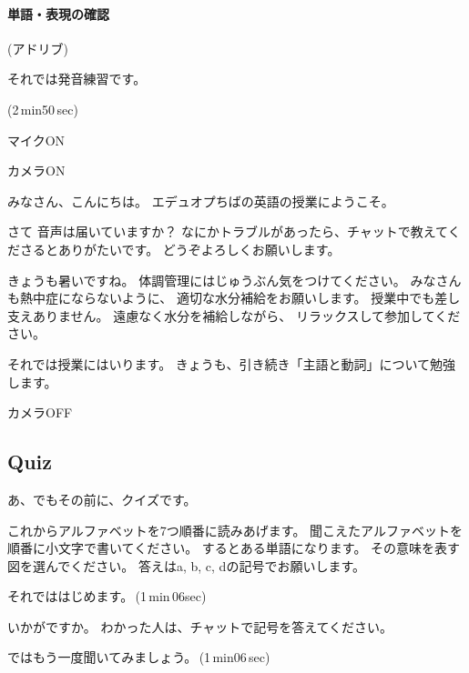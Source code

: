 \documentclass[12pt]{jlreq}
\newenvironment{my_check}
  {\begin{itemize}
    \renewcommand\labelitemi{$\square\hspace{0.5em}$}} %
  {\end{itemize}}
\begin{document}
\paragraph{単語・表現の確認}
(アドリブ)

それでは発音練習です。

\faVolumeUp{}(2\,min50\,sec)
\newpage

\begin{my_check}
\item マイクON
\item カメラON
\end{my_check}

{\LARGE \ComputerMouse}

みなさん、こんにちは。
エデュオプちばの英語の授業にようこそ。

さて
音声は届いていますか？
なにかトラブルがあったら、チャットで教えてくださるとありがたいです。
どうぞよろしくお願いします。



きょうも暑いですね。
体調管理にはじゅうぶん気をつけてください。
みなさんも熱中症にならないように、
適切な水分補給をお願いします。
授業中でも差し支えありません。
遠慮なく水分を補給しながら、
リラックスして参加してください。

それでは授業にはいります。
きょうも、引き続き「主語と動詞」について勉強します。

{\large \ComputerMouse}


\begin{my_check}
\item カメラOFF
\end{my_check}

{\LARGE \ComputerMouse}
\subsection{Quiz}

あ、でもその前に、クイズです。

これからアルファベットを7つ順番に読みあげます。
聞こえたアルファベットを順番に小文字で書いてください。
するとある単語になります。
その意味を表す図を選んでください。
答えはa, b, c, dの記号でお願いします。


それでははじめます。\faVolumeUp\,(1\,min\,06sec)

いかがですか。
わかった人は、チャットで記号を答えてください。


ではもう一度聞いてみましょう。\faVolumeUp\,(1\,min06\,sec)
\end{document}
